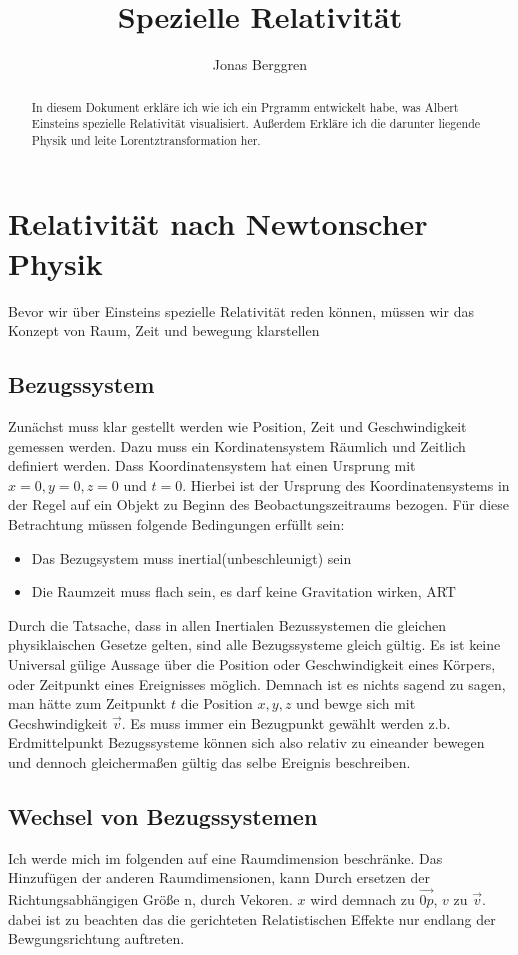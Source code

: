 \documentclass[12pt]{article}
\author{{\Huge Jonas Berggren}}
\title{{\myfont Spezielle Relativität}}
\begin{document}
\maketitle
\tableofcontents
\newpage
\begin{abstract}
In diesem Dokument erkläre ich wie ich ein Prgramm entwickelt habe, was Albert Einsteins spezielle Relativität visualisiert.
Außerdem Erkläre ich die darunter liegende Physik und leite Lorentztransformation her.
\end{abstract}
\section{Relativität nach Newtonscher Physik}
Bevor wir über Einsteins spezielle Relativität reden können, müssen wir das Konzept von Raum, Zeit und bewegung klarstellen
\subsection{Bezugssystem}
Zunächst muss klar gestellt werden wie Position, Zeit und Geschwindigkeit gemessen werden.
Dazu muss ein Kordinatensystem Räumlich und Zeitlich definiert werden.
Dass Koordinatensystem hat einen Ursprung  mit $x = 0, y =0, z = 0$ und $t = 0$.
Hierbei ist der Ursprung des Koordinatensystems in der Regel auf ein Objekt zu Beginn des Beobactungszeitraums bezogen.
Für diese Betrachtung müssen folgende Bedingungen erfüllt sein:
\begin{itemize}
\item Das Bezugsystem muss inertial(unbeschleunigt) sein
\item Die Raumzeit muss flach sein, es darf keine Gravitation wirken, ART
\end{itemize}
Durch die Tatsache, dass in allen Inertialen Bezussystemen die gleichen physiklaischen Gesetze gelten, sind alle Bezugssysteme gleich gültig.
Es ist keine Universal gülige Aussage über die Position oder Geschwindigkeit eines Körpers, oder Zeitpunkt eines Ereignisses möglich.
Demnach ist es nichts sagend zu sagen, man hätte zum Zeitpunkt $t$ die Position $x, y, z$ und bewge sich mit Gecshwindigkeit $\vec{v}$.
Es muss immer ein Bezugpunkt gewählt werden z.b. Erdmittelpunkt %
Bezugssysteme können sich also relativ zu eineander bewegen und dennoch gleichermaßen gültig das selbe Ereignis beschreiben.
\subsection{Wechsel von Bezugssystemen}
Ich werde mich im folgenden auf eine Raumdimension beschränke.
Das Hinzufügen der anderen Raumdimensionen, kann Durch ersetzen der Richtungsabhängigen Größe
n, durch Vekoren.
$x$ wird demnach zu $\vec{0p}$, $v$ zu $\vec{v}$.
dabei ist zu beachten das die gerichteten Relatistischen Effekte nur endlang der Bewgungsrichtung auftreten.
\end{document}
